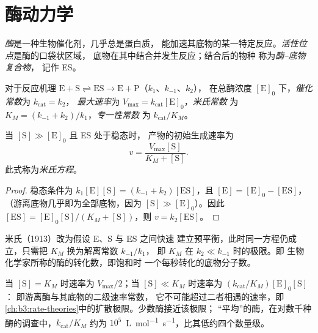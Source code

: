 \section{酶动力学}

\begin{definition}\label{def:b3:complex-kinetics:enzyme}
\emph{酶}是一种生物催化剂，几乎总是蛋白质，
能加速其底物的某一特定反应。\emph{活性位点}是酶的口袋状区域，
底物在其中结合并发生反应；结合后的物种
称为\emph{酶–底物复合物}，
记作 ES。
\end{definition}

\begin{definition}\label{def:b3:complex-kinetics:michaelis}
对于反应机理 $\mathrm{E + S \rightleftharpoons ES \to E + P}$（$k_1$、$k_{-1}$、$k_2$），
在总酶浓度 $[\mathrm E]_0$ 下，\emph{催化常数}为 $k_{\mathrm{cat}} = k_2$，
\emph{最大速率}为 $V_{\max} = k_{\mathrm{cat}}[\mathrm E]_0$，\emph{米氏常数}
为 $K_M = (k_{-1} + k_2)/k_1$，\emph{专一性常数}
为 $k_{\mathrm{cat}}/K_M$。
\end{definition}

\begin{theorem}[米氏方程]\label{thm:b3:complex-kinetics:michaelis-menten}
当 $[\mathrm S] \gg [\mathrm E]_0$ 且 ES 处于稳态时，
产物的初始生成速率为
\[
  v = \frac{V_{\max}[\mathrm S]}{K_M + [\mathrm S]} .
\]
此式称为\emph{米氏方程}。
\end{theorem}

\begin{proof}
稳态条件为 $k_1[\mathrm E][\mathrm S] = (k_{-1} + k_2)[\mathrm{ES}]$，且 $[\mathrm E] = [\mathrm E]_0 - [\mathrm{ES}]$，
（游离底物几乎即为全部底物，因为 $[\mathrm S] \gg [\mathrm E]_0$）。因此 $[\mathrm{ES}]
= [\mathrm E]_0[\mathrm S]/(K_M + [\mathrm S])$，则 $v = k_2[\mathrm{ES}]$。
\end{proof}

\begin{remark}
米氏（1913）改为假设 E、S 与 ES 之间快速
建立预平衡，此时同一方程仍成立，只需把 $K_M$ 换为解离常数 $k_{-1}/k_1$，
即 $K_M$ 在 $k_2 \ll k_{-1}$ 时的极限。即
生物化学家所称的酶的转化数，即饱和时
一个每秒转化的底物分子数。
\end{remark}

当 $[\mathrm S] = K_M$ 时速率为 $V_{\max}/2$；当 $[\mathrm S] \ll K_M$ 时速率为 $(k_{\mathrm{cat}}/K_M)[\mathrm E]_0[\mathrm S]$：
即游离酶与其底物的二级速率常数，
它不可能超过二者相遇的速率，即
\cref{ch:b3:rate-theories}中的扩散极限。少数酶接近该极限；
“平均”的酶，在对数千种酶的调查中，$k_{\mathrm{cat}}/K_M$ 约为
$10^5$~\unit{L.mol^{-1}.s^{-1}}，比其低约四个数量级。

